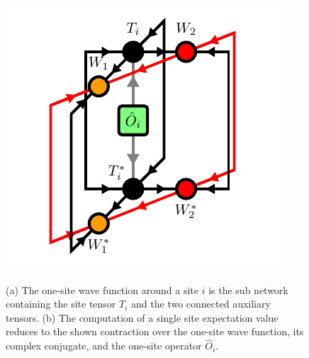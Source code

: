 \begin{figure}
	\centering
	\subcaptionbox{\label{fig:disoTPS_onesite_expectation_value_environment}}
	{%
		\usebox{\largestimage}
	}
	\quad\quad
	\subcaptionbox{\label{fig:disoTPS_onesite_expectation_value_computation}}
	{%
		\raisebox{\dimexpr.5\ht\largestimagea-.5\height}
		{%
			\includegraphics[scale=1.0]{figures/tikz/disoTPS/one_site_expectation_value/one_site_expectation_value_b.pdf}
		}
	}
	\caption{(a) The one-site wave function around a site $i$ is the sub network containing the site tensor $T_i$ and the two connected auxiliary tensors. (b) The computation of a single site expectation value reduces to the shown contraction over the one-site wave function, its complex conjugate, and the one-site operator $\hat{O}_i$.}
	\label{fig:disoTPS_onesite_expectation_value}
\end{figure}
